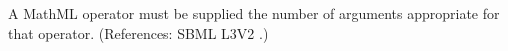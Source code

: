 A MathML operator must be supplied the number of arguments appropriate for
that operator.  (References: SBML L3V2 .)
